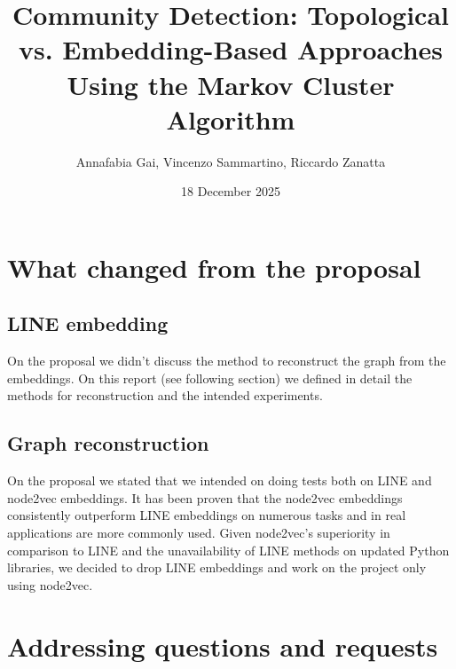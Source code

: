 \documentclass[a4paper,11pt]{article}
\title{Community Detection: Topological vs. Embedding-Based Approaches Using the Markov Cluster Algorithm}
\author{Annafabia Gai, Vincenzo Sammartino, Riccardo Zanatta}
\date{18 December 2025}
\begin{document}
\maketitle

\section{What changed from the proposal}

\subsection{LINE embedding}
On the proposal we didn't discuss the method to reconstruct the graph from the embeddings. On this report (see following section) we defined in detail the methods for reconstruction and the intended experiments.

\subsection{Graph reconstruction}
On the proposal we stated that we intended on doing tests both on LINE and node2vec embeddings. It has been proven that the node2vec embeddings consistently outperform LINE embeddings on numerous tasks and in real applications are more commonly used. Given node2vec's superiority in comparison to LINE and the unavailability of LINE methods on updated Python libraries, we decided to drop LINE embeddings and work on the project only using node2vec.


\section{Addressing questions and requests}
\end{document}

